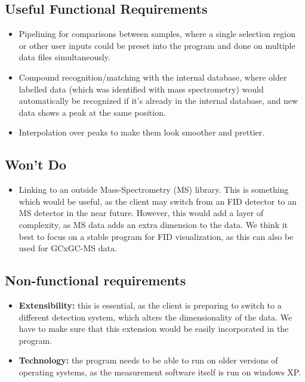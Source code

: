 \documentclass{article}
\begin{document}
\subsection*{Useful Functional Requirements}
\begin{itemize}
	\item Pipelining for comparisons between samples, where a single selection region or other user inputs could be preset into the program and done on multiple data files simultaneously.
	\item Compound recognition/matching with the internal database, where older labelled data (which was identified with mass spectrometry) would automatically be recognized if it's already in the internal database, and new data shows a peak at the same position.
	\item Interpolation over peaks to make them look smoother and prettier.  
\end{itemize}
\subsection*{Won't Do}
\begin{itemize}
	\item Linking to an outside Mass-Spectrometry (MS) library. This is something which would be useful, as the client may switch from an FID detector to an MS detector in the near future. However, this would add a layer of complexity, as MS data adds an extra dimension to the data. We think it best to focus on a stable program for FID visualization, as this can also be used for GCxGC-MS data. 
\end{itemize}
\subsection*{Non-functional requirements}
\begin{itemize}
	\item \textbf{Extensibility:} this is essential, as the client is preparing to switch to a different detection system, which alters the dimensionality of the data. We have to make sure that this extension would be easily incorporated in the program. 
	\item \textbf{Technology:} the program needs to be able to run on older versions of operating systems, as the measurement software itself is run on windows XP. 
\end{itemize}
\end{document}
